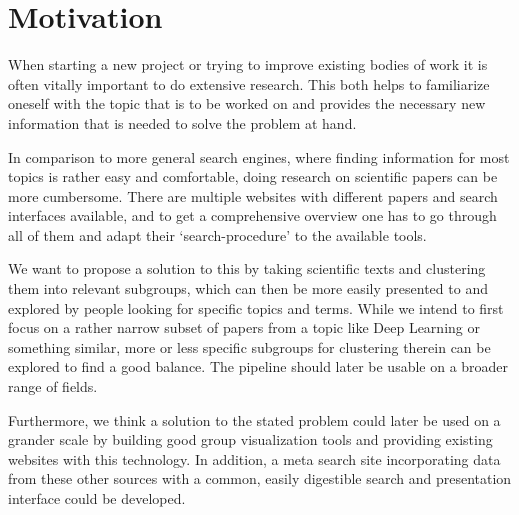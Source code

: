 \section{Motivation}

When starting a new project or trying to improve existing bodies of work it is often vitally important to do extensive research.
This both helps to familiarize oneself with the topic that is to be worked on and provides the necessary new information that is needed to solve the problem at hand.

In comparison to more general search engines, where finding information for most topics is rather easy and comfortable, doing research on scientific papers can be more cumbersome.
There are multiple websites with different papers and search interfaces available, and to get a comprehensive overview one has to go through all of them and adapt their `search-procedure' to the available tools.

We want to propose a solution to this by taking scientific texts and clustering them into relevant subgroups, which can then be more easily presented to and explored by people looking for specific topics and terms.
While we intend to first focus on a rather narrow subset of papers from a topic like Deep Learning or something similar, more or less specific subgroups for clustering therein can be explored to find a good balance.
The pipeline should later be usable on a broader range of fields.

Furthermore, we think a solution to the stated problem could later be used on a grander scale by building good group visualization tools and providing existing websites with this technology.
In addition, a meta search site incorporating data from these other sources with a common, easily digestible search and presentation interface could be developed.